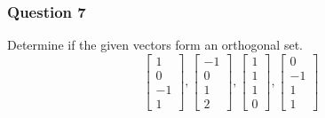 \documentclass{math}
\begin{document}
\subsubsection*{Question 7}
Determine if the given vectors form an orthogonal set.
\[ \begin{bmatrix}1 \\ 0 \\ -1 \\ 1\end{bmatrix},
  \begin{bmatrix}-1 \\ 0 \\ 1 \\ 2\end{bmatrix},
  \begin{bmatrix}1 \\ 1 \\ 1 \\ 0\end{bmatrix},
  \begin{bmatrix}0 \\ -1 \\ 1 \\ 1\end{bmatrix} \]
\end{document}

